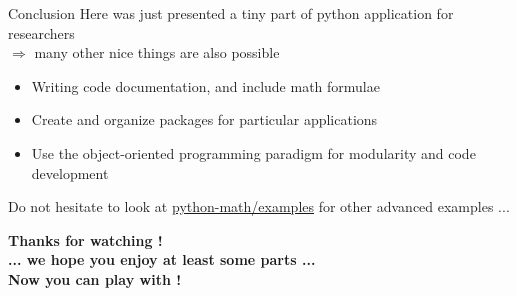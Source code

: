 \documentclass[11pt,unknownkeysallowed,usenames,dvipsnames]{beamer}
\begin{document}
\begin{frame}{Conclusion}
    Here was just presented a tiny part of python application for researchers\\
    $\Rightarrow$ many other nice things are also possible
    \begin{itemize}
        \item Writing code documentation, and include math formulae
        \item Create and organize packages for particular applications
        \item Use the object-oriented programming paradigm for modularity and code development
    \end{itemize}
    Do not hesitate to look at \href{https://gitlab.unige.ch/Thibaut.Lunet/python-math/tree/master/examples}{python-math/examples} for other advanced examples ...
    \begin{center}
        \bfseries
        Thanks for watching ! \\
        ... we hope you enjoy at least some parts ...
        \\ Now you can play with !
    \end{center}
\end{frame}
\end{document}
